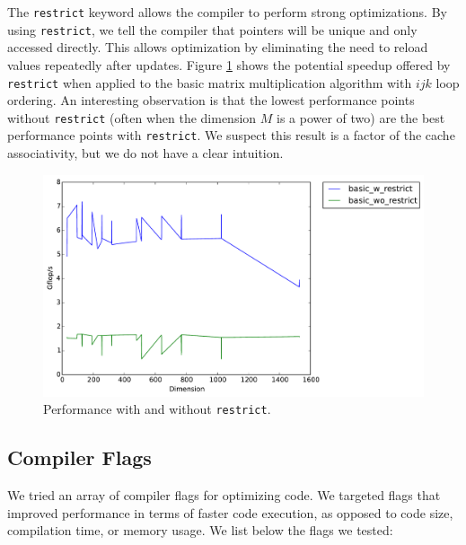 \documentclass[12pt]{article}
\begin{document}
The \texttt{restrict} keyword allows the compiler to perform strong optimizations.
By using \texttt{restrict}, we tell the compiler that pointers will be unique and only accessed directly.
This allows optimization by eliminating the need to reload values repeatedly after updates.
Figure \ref{fig:Restrict} shows the potential speedup offered by \texttt{restrict} when applied to the basic matrix multiplication algorithm with $ijk$ loop ordering.
An interesting observation is that the lowest performance points without \texttt{restrict} (often when the dimension $M$ is a power of two) are the best performance points with \texttt{restrict}.
We suspect this result is a factor of the cache associativity, but we do not have a clear intuition.

\begin{center}
\begin{figure}[h]
\includegraphics[width=6in]{timing_basic_ijk_w_wo_restrict_comparison.pdf}
	\caption{Performance with and without \texttt{restrict}.}
	\label{fig:Restrict}
\end{figure}
\end{center}

\subsection{Compiler Flags}

We tried an array of compiler flags for optimizing code.
We targeted flags that improved performance in terms of faster code execution, as opposed to code size, compilation time, or memory usage.
We list below the flags we tested:
\end{document}
